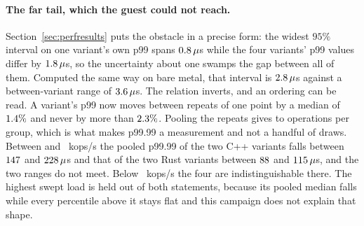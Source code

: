 \documentclass[english,oneside,a4paper,censored,csm,software-track-2020]{HYthesisML}
\begin{document}
\paragraph{The far tail, which the guest could not reach.}
Section~\ref{sec:perfresults} puts the obstacle in a precise form: the widest $95\%$ interval on
one variant's own p99 spans $0.8\,\mu$s while the four variants' p99 values differ by
$1.8\,\mu$s, so the uncertainty about one swamps the gap between all of them.
Computed the same way on bare metal, that interval is $2.8\,\mu$s against a
between-variant range of $3.6\,\mu$s. The relation inverts, and an ordering can be
read. A variant's p99 now moves between repeats of one point by a median of
$1.4\%$ and never by more than $2.3\%$.
Pooling the repeats gives \BmPoolSamplesMin{} to \BmPoolSamplesMax{} operations per group, which
is what makes p99.99 a measurement and not a handful of draws. Between \BmFarTailSepLoad{}
and \BmFarTailSepHi{}~kops/s the pooled p99.99 of the two C++ variants falls between
$147$ and $228\,\mu$s and that of the two Rust variants between
$88$ and $115\,\mu$s, and the two ranges do not meet. Below
\BmFarTailSepLoad{}~kops/s the four are indistinguishable there. The highest swept load is held
out of both statements, because its pooled median falls while every percentile above it stays
flat and this campaign does not explain that shape.
\end{document}

